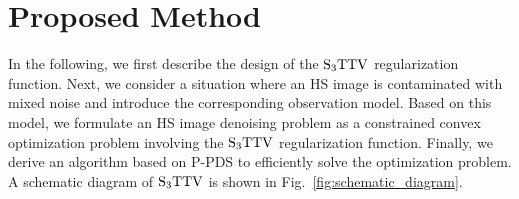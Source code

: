 \documentclass[10pt,journal]{IEEEtran}
\begin{document}

\section{Proposed Method}
\label{sec:proposed_method}

In the following, we first describe the design of the ${\text{S}_{3} \text{TTV}}$ regularization function.
Next, we consider a situation where an HS image is contaminated with mixed noise and introduce the corresponding observation model.
Based on this model, we formulate an HS image denoising problem as a constrained convex optimization problem involving the ${\text{S}_{3} \text{TTV}}$ regularization function.
Finally, we derive an algorithm based on P-PDS to efficiently solve the optimization problem.
A schematic diagram of ${\text{S}_{3} \text{TTV}}$ is shown in Fig.~\ref{fig:schematic_diagram}.
\end{document}
